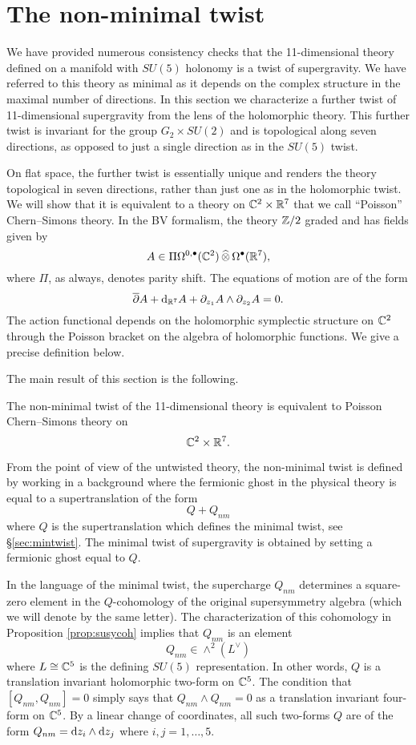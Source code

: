 \section{The non-minimal twist}\label{s:nonmin}

We have provided numerous consistency checks that the 11-dimensional theory defined on a manifold with $SU(5)$ holonomy is a twist of supergravity. 
We have referred to this theory as minimal as it depends on the complex structure in the maximal number of directions. 
In this section we characterize a further twist of 11-dimensional supergravity from the lens of the holomorphic theory.  
This further twist is invariant for the group $G_2 \times SU(2)$ and is topological along seven directions, as opposed to just a single direction as in the $SU(5)$ twist. 

On flat space, the further twist is essentially unique and renders the theory topological in seven directions, rather than just one as in the holomorphic twist. 
We will show that it is equivalent to a theory on $\mathbb C^2 \times \mathbb R^7$ that we call ``Poisson'' Chern--Simons theory. 
In the BV formalism, the theory $\mathbb Z/2$ graded and has fields given by
\[
A \in \Pi \Omega^{0,\bullet}(\mathbb C^2) \, \widehat{\otimes} \, \Omega^\bullet(\mathbb R^7) ,
\]
where $\Pi$, as always, denotes parity shift.
The equations of motion are of the form
\[
\overline{\partial} A + {\rm d}_{\mathbb R^7} A + \partial_{z_1} A \wedge \partial_{z_2} A = 0 .
\]
The action functional depends on the holomorphic symplectic structure on $\mathbb C^2$ through the Poisson bracket on the algebra of holomorphic functions.
We give a precise definition below. 

The main result of this section is the following.

\begin{thm}
\label{thm:nonmin}
The non-minimal twist of the 11-dimensional theory is equivalent to Poisson Chern--Simons theory on 
\[
\mathbb C^2 \times \mathbb R^7 .
\]
\end{thm}

From the point of view of the untwisted theory, the non-minimal twist is defined by working in a background where the fermionic ghost in the physical theory is equal to a supertranslation of the form
\[
Q + Q_{nm} 
\]
where $Q$ is the supertranslation which defines the minimal twist, see \S \ref{sec:mintwist}.
The minimal twist of supergravity is obtained by setting a fermionic ghost equal to $Q$. 

In the language of the minimal twist, the supercharge $Q_{nm}$ determines a square-zero element in the $Q$-cohomology of the original supersymmetry algebra (which we will denote by the same letter). 
The characterization of this cohomology in Proposition \ref{prop:susycoh} implies that $Q_{nm}$ is an element 
\[
Q_{nm} \in \wedge^2 \left(L^\vee\right)
\]
where $L \cong \mathbb C^5$ is the defining $SU(5)$ representation. 
In other words, $Q$ is a translation invariant holomorphic two-form on $\mathbb C^5$. 
The condition that $[Q_{nm}, Q_{nm}] = 0$ simply says that $Q_{nm}\wedge Q_{nm} = 0$ as a translation invariant four-form on $\mathbb C^5$. 
By a linear change of coordinates, all such two-forms $Q$ are of the form $Q_{nm} = {\rm d} z_i \wedge {\rm d} z_j$ where $i,j=1,\ldots, 5$.

